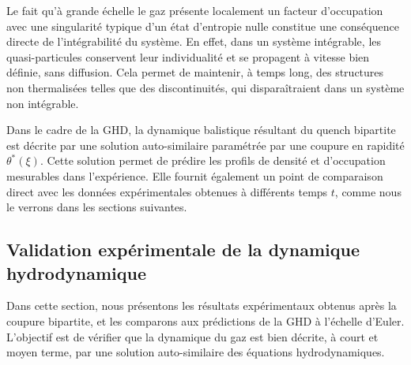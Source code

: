 \medskip

Le fait qu’à grande échelle le gaz présente localement un facteur d’occupation avec une singularité typique d’un état d’entropie nulle constitue une conséquence directe de l’intégrabilité du système. En effet, dans un système intégrable, les quasi-particules conservent leur individualité et se propagent à vitesse bien définie, sans diffusion. Cela permet de maintenir, à temps long, des structures non thermalisées telles que des discontinuités, qui disparaîtraient dans un système non intégrable.

\medskip

Dans le cadre de la GHD, la dynamique balistique résultant du quench bipartite est décrite par une solution auto-similaire paramétrée par une coupure en rapidité $\theta^*(\xi)$. Cette solution permet de prédire les profils de densité et d’occupation mesurables dans l’expérience. Elle fournit également un point de comparaison direct avec les données expérimentales obtenues à différents temps $t$, comme nous le verrons dans les sections suivantes.


\subsection{Validation expérimentale de la dynamique hydrodynamique}
\label{sec.don_exp}



Dans cette section, nous présentons les résultats expérimentaux obtenus après la coupure bipartite, et les comparons aux prédictions de la \gls*{GHD} à l’échelle d’Euler. L’objectif est de vérifier que la dynamique du gaz est bien décrite, à court et moyen terme, par une solution auto-similaire des équations hydrodynamiques.


